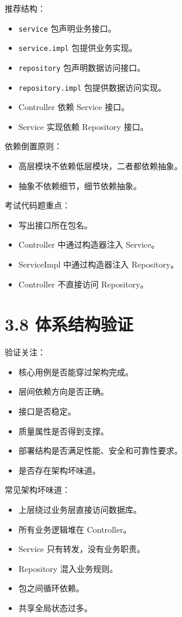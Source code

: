 \documentclass[UTF8,zihao=-4]{ctexart}
\begin{document}
推荐结构：

\begin{itemize}
\item \texttt{service} 包声明业务接口。
\item \texttt{service.impl} 包提供业务实现。
\item \texttt{repository} 包声明数据访问接口。
\item \texttt{repository.impl} 包提供数据访问实现。
\item Controller 依赖 Service 接口。
\item Service 实现依赖 Repository 接口。
\end{itemize}

依赖倒置原则：

\begin{itemize}
\item 高层模块不依赖低层模块，二者都依赖抽象。
\item 抽象不依赖细节，细节依赖抽象。
\end{itemize}

考试代码题重点：

\begin{itemize}
\item 写出接口所在包名。
\item Controller 中通过构造器注入 Service。
\item ServiceImpl 中通过构造器注入 Repository。
\item Controller 不直接访问 Repository。
\end{itemize}

\section{3.8 体系结构验证}

验证关注：

\begin{itemize}
\item 核心用例是否能穿过架构完成。
\item 层间依赖方向是否正确。
\item 接口是否稳定。
\item 质量属性是否得到支撑。
\item 部署结构是否满足性能、安全和可靠性要求。
\item 是否存在架构坏味道。
\end{itemize}

常见架构坏味道：

\begin{itemize}
\item 上层绕过业务层直接访问数据库。
\item 所有业务逻辑堆在 Controller。
\item Service 只有转发，没有业务职责。
\item Repository 混入业务规则。
\item 包之间循环依赖。
\item 共享全局状态过多。
\end{itemize}
\end{document}
